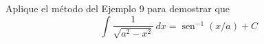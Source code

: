 \item Aplique el método del Ejemplo 9 para demostrar que
    $$\int \frac{1}{\sqrt{a^2 - x^2}} \, dx = \operatorname{sen}^{-1}(x/a) + C$$
